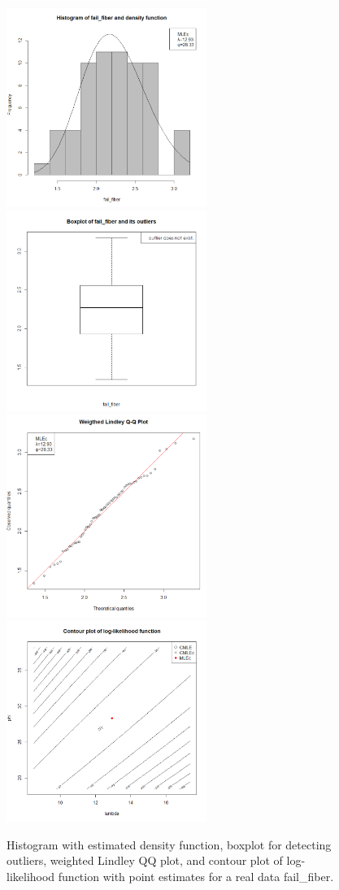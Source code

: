 \begin{figure}[h]%
	\begin{center}
		\includegraphics[width=6.5cm,clip]{hist2.png}
		\includegraphics[width=6.5cm,clip]{boxplot2.png}
		\includegraphics[width=6.5cm,clip]{qq2.png}
		\includegraphics[width=6.5cm,clip]{contour2.png}
		\caption{Histogram with estimated density function, boxplot for detecting outliers, weighted Lindley QQ plot, and contour plot of log-likelihood function with point estimates for a real data fail\_fiber.}  	\label{fig:histogram}
	\end{center}
\end{figure}

